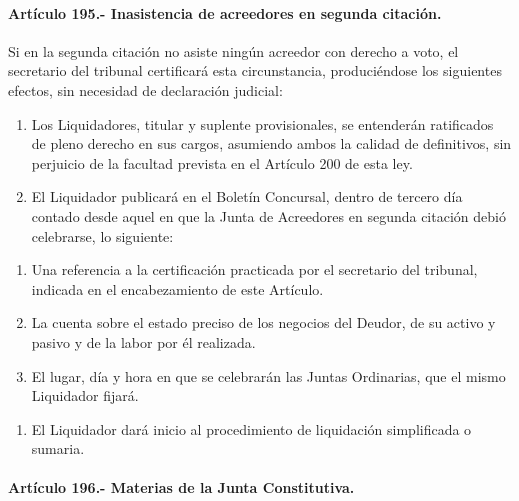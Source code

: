 \documentclass[
]{book}
\providecommand{\tightlist}{%
  \setlength{\itemsep}{0pt}\setlength{\parskip}{0pt}}
\begin{document}
\hypertarget{artuxedculo-195.--inasistencia-de-acreedores-en-segunda-citaciuxf3n.}{%
\paragraph*{Artículo 195.- Inasistencia de acreedores en segunda citación.}\label{artuxedculo-195.--inasistencia-de-acreedores-en-segunda-citaciuxf3n.}}

Si en la segunda citación no asiste ningún acreedor con derecho a voto, el secretario del tribunal certificará esta circunstancia, produciéndose los siguientes efectos, sin necesidad de declaración judicial:

\begin{enumerate}
\def\labelenumi{\arabic{enumi})}
\item
  Los Liquidadores, titular y suplente provisionales, se entenderán ratificados de pleno derecho en sus cargos, asumiendo ambos la calidad de definitivos, sin perjuicio de la facultad prevista en el Artículo 200 de esta ley.
\item
  El Liquidador publicará en el Boletín Concursal, dentro de tercero día contado desde aquel en que la Junta de Acreedores en segunda citación debió celebrarse, lo siguiente:
\end{enumerate}

\begin{enumerate}
\def\labelenumi{\alph{enumi})}
\item
  Una referencia a la certificación practicada por el secretario del tribunal, indicada en el encabezamiento de este Artículo.
\item
  La cuenta sobre el estado preciso de los negocios del Deudor, de su activo y pasivo y de la labor por él realizada.
\item
  El lugar, día y hora en que se celebrarán las Juntas Ordinarias, que el mismo Liquidador fijará.
\end{enumerate}

\begin{enumerate}
\def\labelenumi{\arabic{enumi})}
\setcounter{enumi}{2}
\tightlist
\item
  El Liquidador dará inicio al procedimiento de liquidación simplificada o sumaria.
\end{enumerate}

\hypertarget{artuxedculo-196.--materias-de-la-junta-constitutiva.}{%
\paragraph*{Artículo 196.- Materias de la Junta Constitutiva.}\label{artuxedculo-196.--materias-de-la-junta-constitutiva.}}
\end{document}
